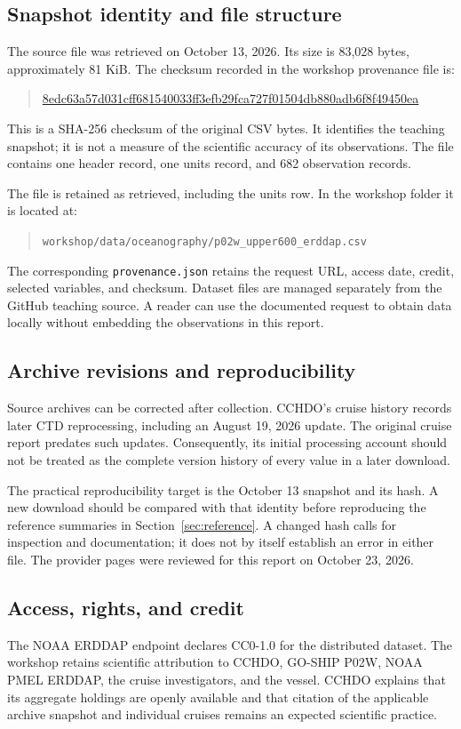 \documentclass[11pt,letterpaper]{article}
\newcommand{\field}[1]{\nolinkurl{#1}}
\begin{document}
\subsection{Snapshot identity and file structure}
\label{sec:snapshot}
The source file was retrieved on October 13, 2026. Its size is 83,028 bytes, approximately 81 KiB. The checksum recorded in the workshop provenance file is:
\begin{quote}
\small\url{8edc63a57d031cff681540033ff3efb29fca727f01504db880adb6f8f49450ea}
\end{quote}
This is a SHA-256 checksum of the original CSV bytes. It identifies the teaching snapshot; it is not a measure of the scientific accuracy of its observations. The file contains one header record, one units record, and 682 observation records.

The file is retained as retrieved, including the units row. In the workshop folder it is located at:
\begin{quote}
\small\field{workshop/data/oceanography/p02w_upper600_erddap.csv}
\end{quote}
The corresponding \field{provenance.json} retains the request URL, access date, credit, selected variables, and checksum. Dataset files are managed separately from the GitHub teaching source. A reader can use the documented request to obtain data locally without embedding the observations in this report.

\subsection{Archive revisions and reproducibility}
Source archives can be corrected after collection. CCHDO's cruise history records later CTD reprocessing, including an August 19, 2026 update.\cite{cruise} The original cruise report predates such updates. Consequently, its initial processing account should not be treated as the complete version history of every value in a later download.

The practical reproducibility target is the October 13 snapshot and its hash. A new download should be compared with that identity before reproducing the reference summaries in Section~\ref{sec:reference}. A changed hash calls for inspection and documentation; it does not by itself establish an error in either file. The provider pages were reviewed for this report on October 23, 2026.

\subsection{Access, rights, and credit}
The NOAA ERDDAP endpoint declares CC0-1.0 for the distributed dataset.\cite{erddap} The workshop retains scientific attribution to CCHDO, GO-SHIP P02W, NOAA PMEL ERDDAP, the cruise investigators, and the vessel. CCHDO explains that its aggregate holdings are openly available and that citation of the applicable archive snapshot and individual cruises remains an expected scientific practice.\cite{license,citation}
\end{document}
